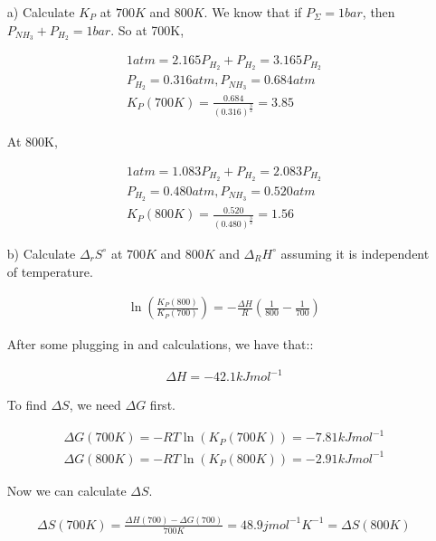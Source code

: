 \documentclass[12pt]{book}
\begin{document}
\begin{itemize}
    \item[a)] Calculate $K_P$ at $700K$ and $800K$.
    We know that if $P_{\Sigma}=1bar$, then $P_{NH_3}+P_{H_2}=1bar$. So at 700K,

    \begin{align*}
        1atm=2.165P_{H_2}+P_{H_2}=3.165P_{H_2}\\
        P_{H_2}=0.316atm, P_{NH_3}=0.684atm\\
        K_P(700K)=\frac{0.684}{(0.316)^{\frac{3}{2}}}=3.85
    \end{align*}

    At 800K,

    \begin{align*}
        1atm=1.083P_{H_2}+P_{H_2}=2.083P_{H_2}\\
        P_{H_2}=0.480atm, P_{NH_3}=0.520atm\\
        K_P(800K)=\frac{0.520}{(0.480)^{\frac{3}{2}}}=1.56
    \end{align*}
    \item[b)] Calculate $\Delta_r S^{\circ}$ at $700K$ and $800K$ and $\Delta_R H^{\circ}$ assuming it is independent of temperature.
    
    \begin{align*}
        \ln\left(\frac{K_P(800)}{K_P(700)}\right)=-\frac{\Delta H}{R}\left(\frac{1}{800}-\frac{1}{700}\right)
    \end{align*}

    After some plugging in and calculations, we have that::

    \begin{align*}
        \Delta H=-42.1kJmol^{-1}
    \end{align*}

    To find $\Delta S$, we need $\Delta G$ first.

    \begin{align*}
        \Delta G(700K)=-RT\ln(K_P(700K))=-7.81kJmol^{-1}
    \end{align*}
    \begin{align*}
        \Delta G(800K)=-RT\ln(K_P(800K))=-2.91kJmol^{-1}
    \end{align*}

    Now we can calculate $\Delta S$.

    \begin{align*}
        \Delta S(700K)=\frac{\Delta H(700)-\Delta G(700)}{700K}=48.9jmol^{-1}K^{-1}=\Delta S(800K)
    \end{align*}


\end{itemize}
\end{document}
